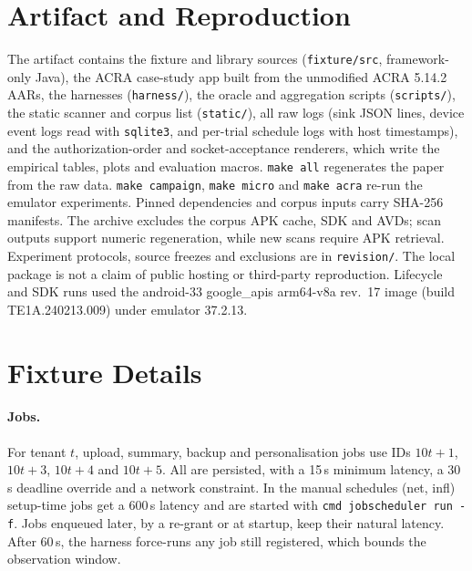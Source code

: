 \section{Artifact and Reproduction}
\label{app:artifact}

The artifact contains the fixture and library sources (\texttt{fixture/src}, framework-only Java), the ACRA case-study app
built from the unmodified ACRA 5.14.2 AARs, the harnesses (\texttt{harness/}), the oracle and aggregation scripts
(\texttt{scripts/}), the static scanner and corpus list (\texttt{static/}), all raw logs (sink JSON lines, device event logs
read with \texttt{sqlite3}, and per-trial schedule logs with host timestamps), and the authorization-order and socket-acceptance renderers, which write the
empirical tables, plots and evaluation macros. \texttt{make all} regenerates the paper from the raw data.
\texttt{make campaign}, \texttt{make micro} and \texttt{make acra} re-run the emulator experiments. Pinned dependencies and corpus inputs carry SHA-256 manifests. The archive excludes the corpus APK
cache, SDK and AVDs; scan outputs support numeric regeneration, while new scans require APK retrieval.
Experiment protocols, source freezes and exclusions are in \texttt{revision/}. The local package
is not a claim of public hosting or third-party reproduction. Lifecycle and SDK runs used the android-33 google\_apis
arm64-v8a rev.~17 image (build TE1A.240213.009) under emulator 37.2.13.









\section{Fixture Details}
\label{app:fixture}

\paragraph{Jobs.} For tenant $t$, upload, summary, backup and personalisation jobs use IDs $10t{+}1$, $10t{+}3$, $10t{+}4$ and
$10t{+}5$. All are persisted, with a 15\,s minimum latency, a 30\,s deadline override and a network constraint. In the manual
schedules (\textsf{net}, \textsf{infl}) setup-time jobs get a 600\,s latency and are started with \texttt{cmd jobscheduler run -f}.
Jobs enqueued later, by a re-grant or at startup, keep their natural latency. After 60\,s, the harness force-runs any job
still registered, which bounds the observation window.

